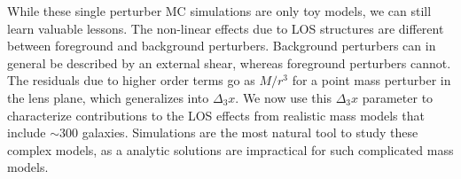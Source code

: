 While these single perturber MC simulations are only toy models, we can still learn valuable lessons. The non-linear effects due to LOS structures are different between foreground and background perturbers. Background perturbers can in general be described by an external shear, whereas foreground perturbers cannot. The residuals due to higher order terms go as $M / r^3$ for a point mass perturber in the lens plane, which generalizes into $\Delta_3 x$. We now use this $\Delta_3x$ parameter to characterize contributions to the LOS effects from realistic mass models that include $\sim 300$ galaxies. Simulations are the most natural tool to study these complex models, as a analytic solutions are impractical for such complicated mass models.